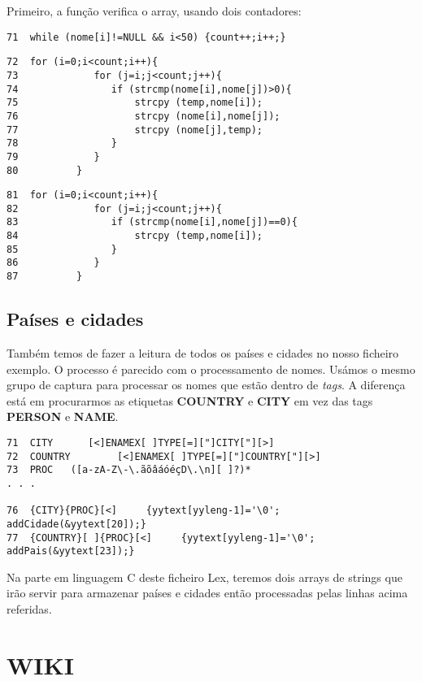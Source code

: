 \documentclass[11pt,a4paper]{report}
\begin{document}
Primeiro, a função verifica o array, usando dois contadores:
\begin{verbatim}
71  while (nome[i]!=NULL && i<50) {count++;i++;}
\end{verbatim}

\begin{verbatim}
72  for (i=0;i<count;i++){
73             for (j=i;j<count;j++){
74                if (strcmp(nome[i],nome[j])>0){
75                    strcpy (temp,nome[i]);
76                    strcpy (nome[i],nome[j]);
77                    strcpy (nome[j],temp);
78                }
79             }
80          }
\end{verbatim}

\begin{verbatim}
81  for (i=0;i<count;i++){
82             for (j=i;j<count;j++){
83                if (strcmp(nome[i],nome[j])==0){
84                    strcpy (temp,nome[i]);
85                }
86             }
87          }
\end{verbatim}


\pagebreak
\section{Países e cidades}
Também temos de fazer a leitura de todos os países e cidades no nosso ficheiro exemplo. O processo é parecido com o processamento de nomes. Usámos o mesmo grupo de captura para processar os nomes que estão dentro de \emph{tags}. A diferença está em procurarmos as etiquetas \textbf{COUNTRY} e \textbf{CITY} em vez das tags \textbf{PERSON} e \textbf{NAME}.

\begin{verbatim}
71  CITY      [<]ENAMEX[ ]TYPE[=]["]CITY["][>]
72  COUNTRY        [<]ENAMEX[ ]TYPE[=]["]COUNTRY["][>]
73  PROC   ([a-zA-Z\-\.ãõâáóéçD\.\n][ ]?)*
. . .

76  {CITY}{PROC}[<]     {yytext[yyleng-1]='\0'; addCidade(&yytext[20]);}
77  {COUNTRY}[ ]{PROC}[<]     {yytext[yyleng-1]='\0'; addPais(&yytext[23]);}
\end{verbatim}

Na parte em linguagem C deste ficheiro Lex, teremos dois arrays de strings que irão servir para armazenar países e cidades então processadas pelas linhas acima referidas.



\raggedbottom
\pagebreak

\chapter{WIKI}
\end{document}
